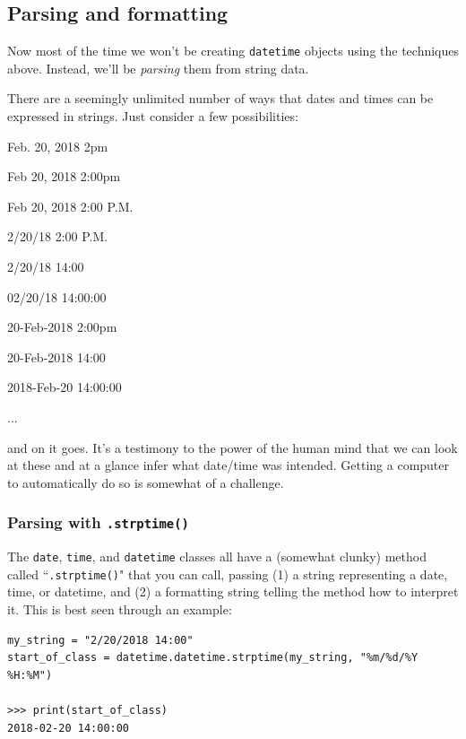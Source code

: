 \documentclass[12pt]{article}
\begin{document}
\vspace{.2in}

\subsection{Parsing and formatting}

Now most of the time we won't be creating \texttt{datetime} objects using the
techniques above. Instead, we'll be \textit{parsing} them from string data.

There are a seemingly unlimited number of ways that dates and times can be
expressed in strings. Just consider a few possibilities:

\begin{compactitem}
\item Feb. 20, 2018 2pm
\item Feb 20, 2018 2:00pm
\item Feb 20, 2018 2:00 P.M.
\item 2/20/18 2:00 P.M.
\item 2/20/18 14:00
\item 02/20/18 14:00:00
\item 20-Feb-2018 2:00pm
\item 20-Feb-2018 14:00
\item 2018-Feb-20 14:00:00
\item ...
\end{compactitem}

and on it goes. It's a testimony to the power of the human mind that we can
look at these and at a glance infer what date/time was intended. Getting a
computer to automatically do so is somewhat of a challenge.

\subsubsection{Parsing with \texttt{.strptime()}}

The \texttt{date}, \texttt{time}, and \texttt{datetime} classes all have a
(somewhat clunky) method called ``\texttt{.strptime()}" that you can call,
passing (1) a string representing a date, time, or datetime, and (2) a
formatting string telling the method how to interpret it. This is best seen
through an example:

\begin{Verbatim}[fontsize=small,samepage=true,frame=none]
my_string = "2/20/2018 14:00"
start_of_class = datetime.datetime.strptime(my_string, "%m/%d/%Y %H:%M")

>>> print(start_of_class)
2018-02-20 14:00:00
\end{Verbatim}
\end{document}
